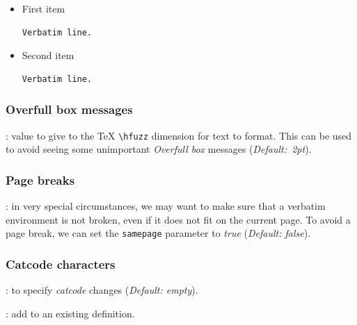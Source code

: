 \documentclass[twoside]{article}
\newcommand\cs[1]{\texttt{\textbackslash#1}}
\providecommand\optname[1]{\textsf{#1}}
\newenvironment{optlist}{\begin{description}%
  \renewcommand\makelabel[1]{%
    \descriptionlabel{\mdseries\optname{##1}}}%
  \itemsep0.25\itemsep}%
 {\end{description}}
\begin{document}
{%
\begin{SideBySideExample}
  \begin{itemize}
    \item First item
    \begin{Verbatim}[frame=single]
  Verbatim line.
    \end{Verbatim}
    \item Second item
    \begin{Verbatim}[frame=single,
                     resetmargins=true]
  Verbatim line.
    \end{Verbatim}
  \end{itemize}
\end{SideBySideExample}
}

\subsubsection{Overfull box messages}

\begin{optlist}
  \item[hfuzz (dimension)]: value to give to the \TeX{} \cs{hfuzz} dimension
  for text to format. This can be used to avoid seeing some unimportant
  \emph{Overfull box} messages (\emph{Default:~2pt}).
\end{optlist}

\subsubsection{Page breaks}

\begin{optlist}
  \item[samepage (boolean)]: in very special circumstances, we may want to
  make sure that a verbatim environment is not broken, even if it does not
  fit on the current page. To avoid a page break, we can set the
  \texttt{samepage} parameter to \emph{true} (\emph{Default: false}).
\end{optlist}

\subsubsection{Catcode characters}

\begin{optlist}
  \item[codes (macro)]: to specify \emph{catcode} changes (\emph{Default:
  empty}).
  \item[codes* (macro)]: add to an existing definition.
\end{optlist}
\end{document}
